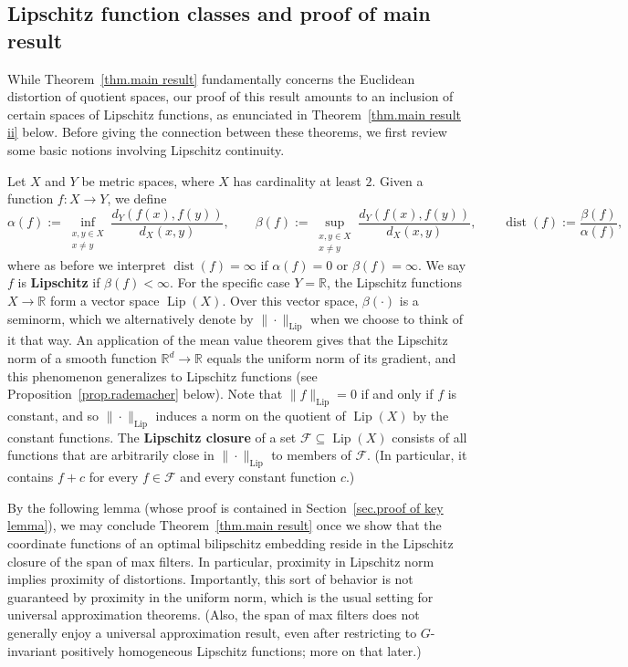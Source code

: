 \documentclass{article}
\theoremstyle{plain}
\theoremstyle{definition}
\begin{document}
\subsection{Lipschitz function classes and proof of main result}

While Theorem~\ref{thm.main result} fundamentally concerns the Euclidean distortion of quotient spaces, our proof of this result amounts to an inclusion of certain spaces of Lipschitz functions, as enunciated in Theorem~\ref{thm.main result ii} below.
Before giving the connection between these theorems, we first review some basic notions involving Lipschitz continuity.

Let $X$ and $Y$ be metric spaces, where $X$ has cardinality at least $2$.
Given a function $f \colon X \to Y$, we define
\[
\alpha(f)
:=\inf_{\substack{x,y\in X\\x\neq y}}\frac{d_Y(f(x),f(y))}{d_X(x,y)},
\qquad
\beta(f)
:=\sup_{\substack{x,y\in X\\x\neq y}}\frac{d_Y(f(x),f(y))}{d_X(x,y)},
\qquad
\operatorname{dist}(f):=\frac{\beta(f)}{\alpha(f)},
\]
where as before we interpret $\operatorname{dist}(f) = \infty$ if $\alpha(f) = 0$ or $\beta(f) = \infty$.
We say $f$ is \textbf{Lipschitz} if $\beta(f) < \infty$.
For the specific case $Y = \mathbb{R}$, the Lipschitz functions $X \to \mathbb{R}$ form a vector space $\operatorname{Lip}(X)$.
Over this vector space, $\beta(\cdot)$ is a seminorm, which we alternatively denote by $\|\cdot\|_{\operatorname{Lip}}$ when we choose to think of it that way.
An application of the mean value theorem gives that the Lipschitz norm of a smooth function $\mathbb{R}^d\to\mathbb{R}$ equals the uniform norm of its gradient, and this phenomenon generalizes to Lipschitz functions (see Proposition~\ref{prop.rademacher} below).
Note that 
$\|f\|_{\operatorname{Lip}}=0$ if and only if $f$ is constant, and so $\|\cdot\|_{\operatorname{Lip}}$
induces a norm on the quotient of $\operatorname{Lip}(X)$ by the constant functions.
The \textbf{Lipschitz closure} of a set $\mathcal{F}\subseteq\operatorname{Lip}(X)$ consists of all functions that are arbitrarily close in $\|\cdot\|_{\operatorname{Lip}}$ to members of $\mathcal{F}$.
(In particular, it contains $f+c$ for every $f\in \mathcal{F}$ and every constant function $c$.)

By the following lemma (whose proof is contained in Section~\ref{sec.proof of key lemma}), we may conclude Theorem~\ref{thm.main result} once we show that the coordinate functions of an optimal bilipschitz embedding reside in the Lipschitz closure of the span of max filters.
In particular, proximity in Lipschitz norm implies proximity of distortions.
Importantly, this sort of behavior is not guaranteed by proximity in the uniform norm, which is the usual setting for universal approximation theorems.
(Also, the span of max filters does not generally enjoy a universal approximation result, even after restricting to $G$-invariant positively homogeneous Lipschitz functions; more on that later.)
\end{document}
